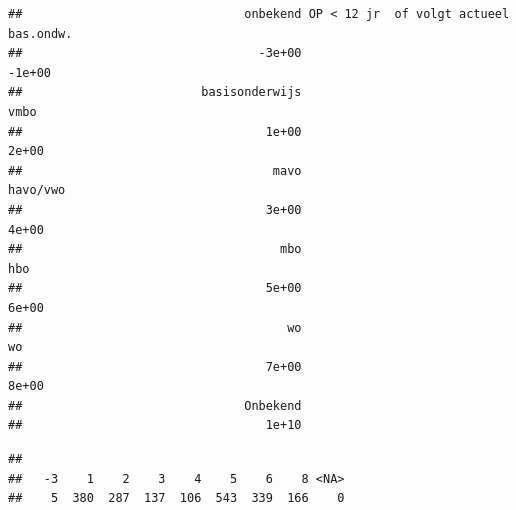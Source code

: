 \documentclass[
]{book}
\newenvironment{Shaded}{\begin{snugshade}}{\end{snugshade}}
\newcommand{\DataTypeTok}[1]{\textcolor[rgb]{0.13,0.29,0.53}{#1}}
\newcommand{\KeywordTok}[1]{\textcolor[rgb]{0.13,0.29,0.53}{\textbf{#1}}}
\newcommand{\NormalTok}[1]{#1}
\newcommand{\OperatorTok}[1]{\textcolor[rgb]{0.81,0.36,0.00}{\textbf{#1}}}
\newcommand{\StringTok}[1]{\textcolor[rgb]{0.31,0.60,0.02}{#1}}
\begin{document}
\begin{Shaded}
\end{Shaded}

\begin{verbatim}
##                               onbekend OP < 12 jr  of volgt actueel bas.ondw. 
##                                 -3e+00                                 -1e+00 
##                         basisonderwijs                                   vmbo 
##                                  1e+00                                  2e+00 
##                                   mavo                               havo/vwo 
##                                  3e+00                                  4e+00 
##                                    mbo                                    hbo 
##                                  5e+00                                  6e+00 
##                                     wo                                     wo 
##                                  7e+00                                  8e+00 
##                               Onbekend 
##                                  1e+10
\end{verbatim}

\begin{Shaded}
\end{Shaded}

\begin{verbatim}
## 
##   -3    1    2    3    4    5    6    8 <NA> 
##    5  380  287  137  106  543  339  166    0
\end{verbatim}
\end{document}
